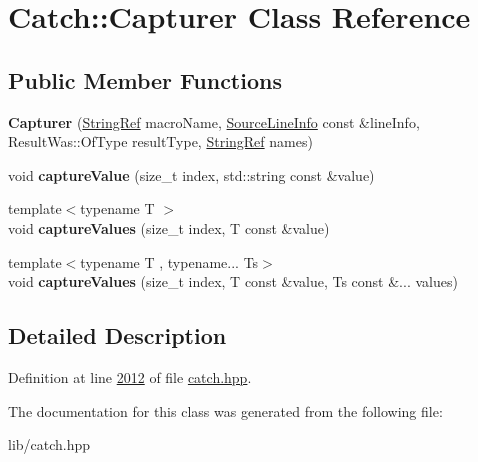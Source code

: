 \hypertarget{classCatch_1_1Capturer}{}\section{Catch\+::Capturer Class Reference}
\label{classCatch_1_1Capturer}
\subsection*{Public Member Functions}
\begin{DoxyCompactItemize}
\item 
\mbox{\label{classCatch_1_1Capturer_a86b0b27acc803a4e1310c10820f3038f}} 
{\bfseries Capturer} (\mbox{\hyperlink{classCatch_1_1StringRef}{String\+Ref}} macro\+Name, \mbox{\hyperlink{structCatch_1_1SourceLineInfo}{Source\+Line\+Info}} const \&line\+Info, Result\+Was\+::\+Of\+Type result\+Type, \mbox{\hyperlink{classCatch_1_1StringRef}{String\+Ref}} names)
\item 
\mbox{\label{classCatch_1_1Capturer_a0695ebf77f7cdcb344c73bcb3d9131e4}} 
void {\bfseries capture\+Value} (size\+\_\+t index, std\+::string const \&value)
\item 
\mbox{\label{classCatch_1_1Capturer_a60d08e6db2e54740bb2298bbbec3bc0b}} 
{\footnotesize template$<$typename T $>$ }\\void {\bfseries capture\+Values} (size\+\_\+t index, T const \&value)
\item 
\mbox{\label{classCatch_1_1Capturer_a76f2a097cfeb3042688300b81eb9bcbc}} 
{\footnotesize template$<$typename T , typename... Ts$>$ }\\void {\bfseries capture\+Values} (size\+\_\+t index, T const \&value, Ts const \&... values)
\end{DoxyCompactItemize}


\subsection{Detailed Description}


Definition at line \mbox{\hyperlink{catch_8hpp_source_l02012}{2012}} of file \mbox{\hyperlink{catch_8hpp_source}{catch.\+hpp}}.



The documentation for this class was generated from the following file\+:\begin{DoxyCompactItemize}
\item 
lib/catch.\+hpp\end{DoxyCompactItemize}
